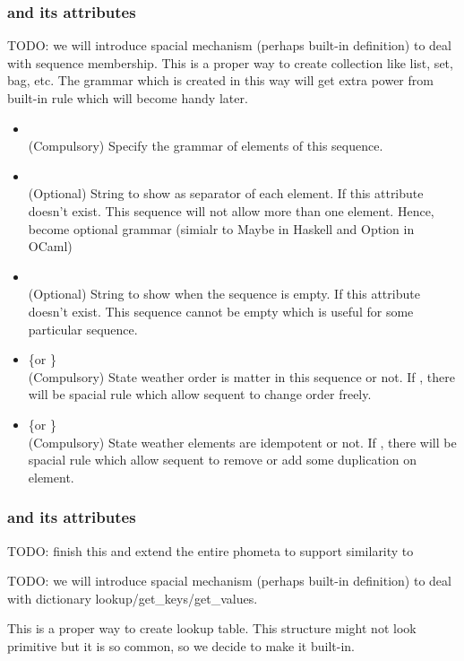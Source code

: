 \documentclass[11pt, a4paper]{article}
\begin{document}
\subsubsection{\kSequence and its attributes}
TODO: we will introduce spacial mechanism (perhaps built-in definition) to deal with sequence membership.
This is a proper way to create collection like list, set, bag, etc. The grammar which is created in this way will get extra power from built-in rule which will become handy later.
\begin{itemize}
    \item \kSubGrammar {} \\
    (Compulsory) Specify the grammar of elements of this sequence.
    \item \kDelimiter {} \\
    (Optional) String to show as separator of each element. If this attribute doesn't exist. This sequence will not allow more than one element. Hence, become optional grammar (simialr to Maybe in Haskell and Option in OCaml)
    \item \kWhenEmpty {} \\
    (Optional) String to show when the sequence is empty. If this attribute doesn't exist. This sequence cannot be empty which is useful for some particular sequence.
    \item \kCommutative \{\kTrue or \kFalse\} \\
    (Compulsory) State weather order is matter in this sequence or not. If \kTrue, there will be spacial rule which allow sequent to change order freely.
    \item \kIdempotent \{\kTrue or \kFalse\} \\
    (Compulsory) State weather elements are idempotent or not. If \kTrue, there will be spacial rule which allow sequent to remove or add some duplication on element.
\end{itemize}

\subsubsection{\kDictionary and its attributes}
TODO: finish this and extend the entire phometa to support \kDictionary similarity to \kSequence

TODO: we will introduce spacial mechanism (perhaps built-in definition) to deal with dictionary lookup/get\_keys/get\_values.

This is a proper way to create lookup table. This structure might not look primitive but it is so common, so we decide to make it built-in.
\end{document}
